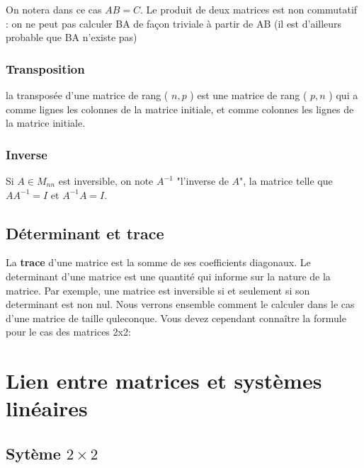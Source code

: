 On notera dans ce cas $A B=C$. Le produit de deux matrices est non commutatif : on ne peut pas calculer BA de façon triviale à partir de AB (il est d'ailleurs probable que BA n'existe pas)

\subsubsection*{Transposition}
la transposée d'une matrice de rang ( $n, p$ ) est une matrice de rang ( $p, n$ ) qui a comme lignes les colonnes de la matrice initiale, et comme colonnes les lignes de la matrice initiale.

\subsubsection*{Inverse}

Si $A \in M_{n n}$ est inversible, on note $A^{-1}$ "l'inverse de $A$", la matrice telle que $A A^{-1}=I$ et $A^{-1} A=I$.

\subsection{Déterminant et trace}
La {\bf trace} d'une matrice est la somme de ses coefficients diagonaux. Le determinant d'une matrice est une quantité qui informe sur la nature de la matrice. Par exemple, une matrice est inversible si et seulement si son determinant est non nul. Nous verrons ensemble comment le calculer dans le cas d'une matrice de taille quleconque. Vous devez cependant connaître la formule pour le cas des matrices 2x2:



\section{Lien entre matrices et systèmes linéaires}

\subsection{Sytème $2 \times 2$}

